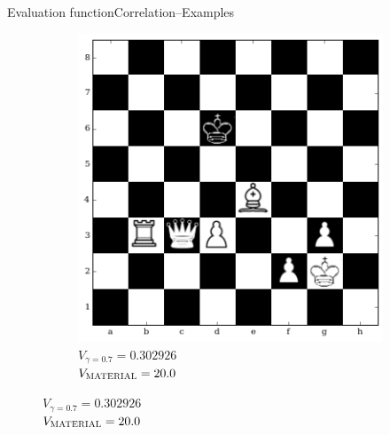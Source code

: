 \documentclass[9pt, unknownkeysallowed]{beamer}
\begin{document}
\begin{frame}{Evaluation function}{Correlation--Examples}
\begin{figure}[h]
\begin{subfigure}[t]{0.3\textwidth}
    \includegraphics[width=\textwidth]{../img/table_evaluations/output_36_0.png}
         \caption{$V_{\gamma=0.7} = 0.302926$\\  
$V_{\textsc{MATERIAL}}= 20.0 $}
    \label{figure:correlation2d}
    \end{subfigure}
\end{figure} 
\end{frame}
\end{document}
